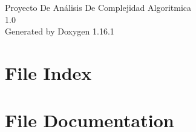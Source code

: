 \documentclass[twoside]{book}
\newcommand{\+}{\discretionary{\mbox{\scriptsize$\hookleftarrow$}}{}{}}
\newcommand{\clearemptydoublepage}{%
    \newpage{\pagestyle{empty}\cleardoublepage}%
  }
\begin{document}
  \raggedbottom
    \hypersetup{pageanchor=false,
                bookmarksnumbered=true,
                pdfencoding=unicode
               }
  \begin{titlepage}
  \vspace*{7cm}
  \begin{center}%
  {\Large Proyecto De Análisis De Complejidad Algoritmica}\\
  [1ex]\large 1.\+0 \\
  \vspace*{1cm}
  {\large Generated by Doxygen 1.16.1}\\
  \end{center}
  \end{titlepage}
  \clearemptydoublepage
  \tableofcontents
  \clearemptydoublepage
  \hypersetup{pageanchor=true}

\chapter{File Index}

\chapter{File Documentation}




  \backmatter
  \newpage
  \clearemptydoublepage
  \printindex
\end{document}
